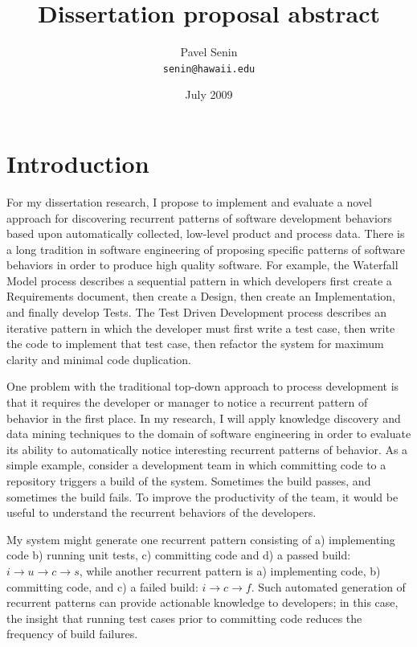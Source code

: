 \documentclass[11pt,oneside]{article}
\begin{document}
\title{Dissertation proposal abstract}
\author{Pavel Senin \\
 \texttt{senin@hawaii.edu}
}
\date{July 2009}
\maketitle

\section{Introduction}
For my dissertation research, I propose to implement and evaluate a novel approach for discovering recurrent patterns of software development behaviors based upon automatically collected, low-level product and process data. There is a long tradition in software engineering of proposing specific patterns of software behaviors in order to produce high quality software. For example, the Waterfall Model process describes a sequential pattern in which developers first create a Requirements document, then create a Design, then create an Implementation, and finally develop Tests. The Test Driven Development process describes an iterative pattern in which the developer must first write a test case, then write the code to implement that test case, then refactor the system for maximum clarity and minimal code duplication.

One problem with the traditional top-down approach to process development is that it requires the developer or manager to notice a recurrent pattern of behavior in the first place. In my research, I will apply knowledge discovery and data mining techniques to the domain of software engineering in order to evaluate its ability to automatically notice interesting recurrent patterns of behavior. As a simple example, consider a development team in which committing code to a repository triggers a build of the system. Sometimes the build passes, and sometimes the build fails. To improve the productivity of the team, it would be useful to understand the recurrent behaviors of the developers. 

My system might generate one recurrent pattern consisting of a) implementing code b) running unit tests, c) committing code and d) a passed build: $i \rightarrow u \rightarrow c \rightarrow s $, while another recurrent pattern is a) implementing code, b) committing code, and c) a failed build: $i \rightarrow c \rightarrow f $. Such automated generation of recurrent patterns can provide actionable knowledge to developers; in this case, the insight that running test cases prior to committing code reduces the frequency of build failures.
\end{document}
